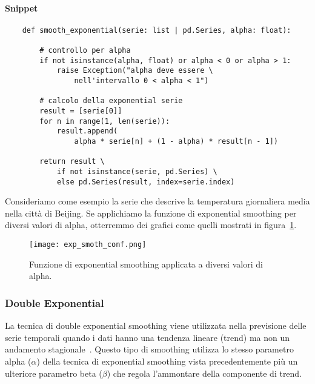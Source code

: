 \paragraph*{Snippet}
\begin{verbatim}
    def smooth_exponential(serie: list | pd.Series, alpha: float):

        # controllo per alpha
        if not isinstance(alpha, float) or alpha < 0 or alpha > 1:
            raise Exception("alpha deve essere \
                nell'intervallo 0 < alpha < 1")

        # calcolo della exponential serie
        result = [serie[0]]
        for n in range(1, len(serie)):
            result.append(
                alpha * serie[n] + (1 - alpha) * result[n - 1])

        return result \
            if not isinstance(serie, pd.Series) \
            else pd.Series(result, index=serie.index)
\end{verbatim}

\begin{esempio}
    Consideriamo come esempio la serie che descrive la temperatura giornaliera media
    nella città di Beijing. Se applichiamo la funzione di exponential smoothing per diversi
    valori di alpha, otterremmo dei grafici come quelli mostrati in figura~\ref{fig:exp_smoot}.
    
    \begin{figure}[H]
        \centering
        \texttt{[image: exp\_smoth\_conf.png]}
        \caption{Funzione di exponential smoothing applicata a diversi valori di alpha.}
        \label{fig:exp_smoot}
    \end{figure}

\end{esempio}


\subsubsection{Double Exponential}
La tecnica di double exponential smoothing viene utilizzata nella previsione delle 
serie temporali quando i dati hanno una tendenza lineare (trend) ma non un andamento stagionale~\cite{si:dexp_smot}.
Questo tipo di smoothing utilizza lo stesso parametro alpha ($\alpha$) della tecnica di exponential
smoothing vista precedentemente più un ulteriore parametro beta ($\beta$) che regola l'ammontare
della componente di trend.


